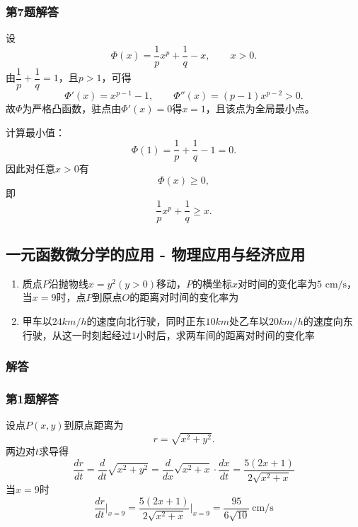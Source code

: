 \documentclass[./book.tex]{subfiles}
\begin{document}
    \subsubsection*{第7题解答}
    \begin{analysisbox}
        设
        \[
            \Phi(x)=\frac1p x^p+\frac1q-x,\qquad x>0.
        \]
        由$\dfrac1p+\dfrac1q=1$，且$p>1$，可得
        \[
            \Phi'(x)=x^{p-1}-1,\qquad
            \Phi''(x)=(p-1)x^{p-2}>0.
        \]
        故$\Phi$为严格凸函数，驻点由$\Phi'(x)=0$得$x=1$，且该点为全局最小点。

        计算最小值：
        \[
            \Phi(1)=\frac1p+\frac1q-1=0.
        \]
        因此对任意$x>0$有
        \[
            \Phi(x)\ge 0,
        \]
        即
        \[
            \boxed{\frac1p x^p+\frac1q\ge x}.
        \]
    \end{analysisbox}

    \subsection{一元函数微分学的应用 - 物理应用与经济应用}

    \begin{enumerate}
        \item 质点$P$沿抛物线$x = y^2(y > 0)$移动，$P$的横坐标$x$对时间的变化率为$5\text{ cm/s}$，当$x = 9$时，点$P$到原点$O$的距离对时间的变化率为
        \item 甲车以$24km/h$的速度向北行驶，同时正东$10km$处乙车以$20km/h$的速度向东行驶，从这一时刻起经过$1$小时后，求两车间的距离对时间的变化率
    \end{enumerate}

    \subsubsection{解答}

    \subsubsection*{第1题解答}
    \begin{analysisbox}
        设点$P(x,y)$到原点距离为
        \[
            r=\sqrt{x^2+y^2}.
        \]
        两边对$t$求导得
        \[
            \frac{dr}{dt}=\frac{d}{dt}\sqrt{x^2 + y^2} = \frac{d}{dx}\sqrt{x^2 + x} \cdot \frac{dx}{dt} = \frac{5(2x + 1)}{2\sqrt{x^2 + x}}
        \]
        当$x=9$时
        \[
            \frac{dr}{dt}\Big|_{x=9}
            =\frac{5(2x + 1)}{2\sqrt{x^2 + x}}\Big|_{x=9} = \boxed{\frac{95}{6\sqrt{10}}\ \text{cm/s}}
        \]
    \end{analysisbox}
\end{document}
